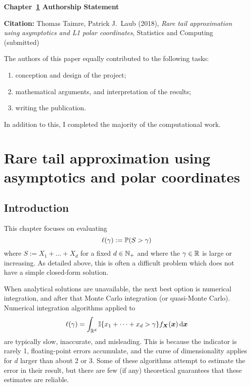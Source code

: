 \vspace*{\fill}

{\large \bf Chapter~\ref{chp:angular} Authorship Statement}

\vspace{1em}


{\bf Citation:} Thomas Taimre, Patrick J.\ Laub (2018), \emph{Rare tail approximation using asymptotics and L1 polar coordinates}, Statistics and Computing (submitted)

\vspace{1em}

The authors of this paper equally contributed to the following tasks:
\begin{enumerate}
\item conception and design of the project;
\item mathematical arguments, and interpretation of the results;
\item writing the publication.
\end{enumerate}

In addition to this, I completed the majority of the computational work.

\vspace{3em}

\vspace*{\fill}

\chapter{Rare tail approximation using asymptotics and polar coordinates} \label{chp:angular}

\section{Introduction}

This chapter focuses on evaluating
\begin{equation} \label{ProbabilityOfInterest}
\ell(\gamma) := \operatorname{{\mathbb P}}(S > \gamma)
\end{equation}
where $S := X_1 + \dots + X_d$ for a fixed $d \in \mathbb{N}_+$ and where the $\gamma \in \mathbb{R}$ is large or increasing. As detailed above, this is often a difficult problem which does not have a simple closed-form solution.

When analytical solutions are unavailable, the next best option is numerical integration, and after that Monte Carlo integration (or quasi-Monte Carlo).
Numerical integration algorithms applied to
\[ \ell(\gamma) = \int_{\mathbb{R}^d} \mathbb{I}\{  x_1 + \dots + x_d > \gamma \} f_{\bm{X}}(\bm{x}) \mathop{}\!\mathrm{d} \bm{x} \]
are typically slow, inaccurate, and misleading. This is because the indicator is rarely 1, floating-point errors accumulate, and the curse of dimensionality applies for $d$ larger than about 2 or 3. Some of these algorithms attempt to estimate the error in their result, but there are few (if any) theoretical guarantees that these estimates are reliable.

